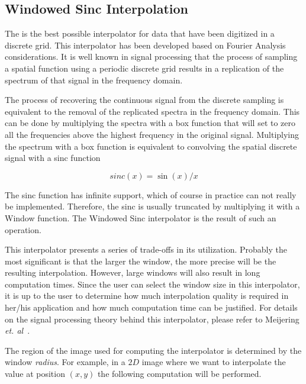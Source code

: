 \subsection{Windowed Sinc Interpolation}
\label{sec:WindowedSincInterpolation}

The  is the best possible
interpolator for data that have been digitized in a discrete grid. This
interpolator has been developed based on Fourier Analysis considerations. It
is well known in signal processing that the process of sampling a spatial
function using a periodic discrete grid results in a replication of the
spectrum of that signal in the frequency domain.

The process of recovering the continuous signal from the discrete sampling is
equivalent to the removal of the replicated spectra in the frequency domain.
This can be done by multiplying the spectra with a box function that will set
to zero all the frequencies above the highest frequency in the original signal.
Multiplying the spectrum with a box function is equivalent to convolving the
spatial discrete signal with a sinc function

\begin{equation}
sinc(x) = \sin{(x)} / x
\end{equation}

The sinc function has infinite support, which of course in practice can not
really be implemented. Therefore, the sinc is usually truncated by multiplying
it with a Window function. The Windowed Sinc interpolator is the result of such an
operation.

This interpolator presents a series of trade-offs in its utilization. Probably
the most significant is that the larger the window, the more precise will be
the resulting interpolation. However, large windows will also result in long
computation times. Since the user can select the window size in this
interpolator, it is up to the user to determine how much interpolation quality
is required in her/his application and how much computation time can be
justified. For details on the signal processing theory behind this
interpolator, please refer to Meijering \emph{et.
al}~\cite{SignalReconstruction}.

The region of the image used for computing the interpolator is determined by
the window \emph{radius}. For example, in a $2D$ image where we want to
interpolate the value at position $(x,y)$ the following computation will be
performed.

